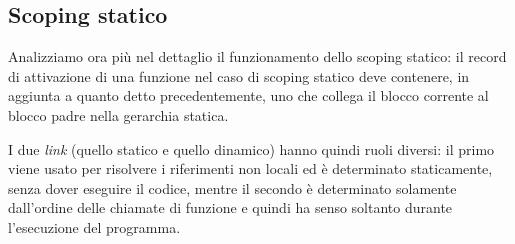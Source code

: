 \subsection*{Scoping statico}
Analizziamo ora più nel dettaglio il funzionamento dello scoping statico: il record di attivazione di una funzione nel caso di scoping statico deve contenere, in aggiunta a quanto detto precedentemente, uno  che collega il blocco corrente al blocco padre nella gerarchia statica.

I due \emph{link} (quello statico e quello dinamico) hanno quindi ruoli diversi: il primo viene usato per risolvere i riferimenti non locali ed è determinato staticamente, senza dover eseguire il codice, mentre il secondo è determinato solamente dall'ordine delle chiamate di funzione e quindi ha senso soltanto durante l'esecuzione del programma.


